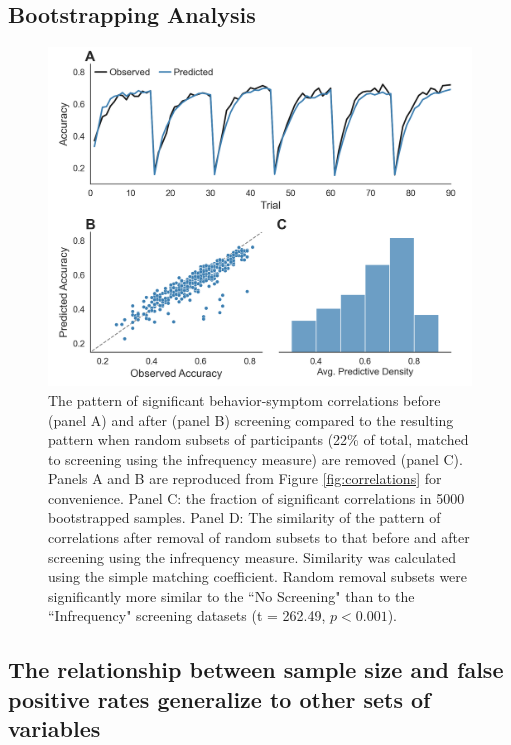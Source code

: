 \documentclass[a4paper,notitlepage,12pt]{article}
\begin{document}
\begin{refsection}[supp]
\clearpage

\subsection*{Bootstrapping Analysis}
\begin{figure}[H]
\includegraphics[width=16cm]{../figures/supp_02.png}
\centering
\captionsetup{width=0.88\textwidth}
\caption{The pattern of significant behavior-symptom correlations before (panel A) and after (panel B) screening compared to the resulting pattern when random subsets of participants (22\% of total, matched to screening using the infrequency measure) are removed (panel C). Panels A and B are reproduced from Figure \ref{fig:correlations} for convenience. Panel C: the fraction of significant correlations in 5000 bootstrapped samples. Panel D: The similarity of the pattern of correlations after removal of random subsets to that before and after screening using the infrequency measure. Similarity was calculated using the simple matching coefficient. Random removal subsets were significantly more similar to the ``No Screening" than to the ``Infrequency" screening datasets (t = 262.49, $p < 0.001$).}
\label{fig:random}
\end{figure}

\clearpage

\subsection*{The relationship between sample size and false positive rates generalize to other sets of variables}


\end{refsection}
\end{document}
